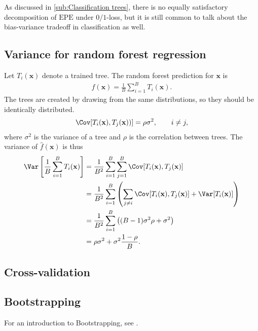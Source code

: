 As discussed in \ref{sub:Classification trees}, there is no equally satisfactory decomposition of $\mathrm{EPE}$ under $0/1$-loss, but it is still common to talk about the bias-variance tradeoff in classification as well.

\subsection{Variance for random forest regression}
\label{sub:Variance for random forest regression}
Let $T_i(\mathbf{x})$ denote a trained tree. The random forest prediction for $\mathbf{x}$ is 
\begin{align}
  \hat f(\mathbf{x}) = \frac{1}{B} \sum_{i = 1}^{B} T_i(\mathbf{x}).
\end{align}
The trees are created by drawing from the same distributions, so they should be identically distributed. 
\begin{align}
  \Cov[T_i(\mathbf{x}), T_j(\mathbf{x}))] = \rho \sigma^2, \quad \quad i \neq j,
\end{align}
where $\sigma^2$ is the variance of a tree and $\rho$ is the correlation between trees.  
The variance of $\hat f(\mathbf{x})$ is thus
\begin{align}
\Var\left[ \frac{1}{B} \sum_{i = 1}^{B} T_i(\mathbf{x}) \right] 
&= \frac{1}{B^2} \sum_{i =1}^B \sum_{j= 1}^B \Cov[T_i(\mathbf{x}), T_j(\mathbf{x})] \notag \\
&= \frac{1}{B^2} \sum_{i =1}^B \left(\sum_{j \neq i} \Cov[T_i(\mathbf{x}), T_j(\mathbf{x})] + \Var[T_i(\mathbf{x})]  \right)\notag \\
&= \frac{1}{B^2} \sum_{i =1}^B \left( (B-1) \sigma^2 \rho + \sigma^2  \right)\notag \\
&= \rho \sigma^2 + \sigma^2 \frac{1-\rho}{B}.
\end{align}


\subsection{Cross-validation}
\label{sec:Cross-validation}

\subsection{Bootstrapping}
\label{sec:Bootstrapping}
For an introduction to Bootstrapping, see \cite{efron1994bootstrap}.
